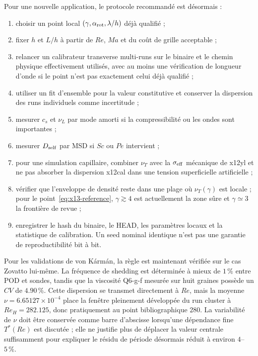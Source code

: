 \documentclass[11pt,a4paper]{article}
\begin{document}
Pour une nouvelle application, le protocole recommandé est désormais :
\begin{enumerate}[leftmargin=2em]
  \item choisir un point local $(\gamma,\alpha_{\rm rot},\lambda/h)$ déjà qualifié ;
  \item fixer $h$ et $L/h$ à partir de $Re$, $Ma$ et du coût de grille acceptable ;
  \item relancer un calibrateur transverse multi-runs sur le binaire et le chemin physique effectivement utilisés, avec au moins une vérification de longueur d'onde si le point n'est pas exactement celui déjà qualifié ;
  \item utiliser un fit d'ensemble pour la valeur constitutive et conserver la dispersion des runs individuels comme incertitude ;
  \item mesurer $c_s$ et $\nu_L$ par mode amorti si la compressibilité ou les ondes sont importantes ;
  \item mesurer $D_{\rm self}$ par MSD si $Sc$ ou $Pe$ intervient ;
  \item pour une simulation capillaire, combiner $\nu_T$ avec la $\sigma_{\rm eff}$ mécanique de x12yl et ne pas absorber la dispersion x12cal dans une tension superficielle artificielle ;
  \item vérifier que l'enveloppe de densité reste dans une plage où $\nu_T(\gamma)$ est locale ; pour le point~\eqref{eq:x13-reference}, $\gamma\gtrsim4$ est actuellement la zone sûre et $\gamma\simeq3$ la frontière de revue ;
  \item enregistrer le hash du binaire, le HEAD, les paramètres locaux et la statistique de calibration. Un seed nominal identique n'est pas une garantie de reproductibilité bit à bit.
\end{enumerate}

Pour les validations de von Kármán, la règle est maintenant vérifiée sur le cas Zovatto lui-même. La fréquence de shedding est déterminée à mieux de $1\,\%$ entre POD et sondes, tandis que la viscosité Q6-g-f mesurée sur huit graines possède un $CV$ de $4.90\,\%$. Cette dispersion se transmet directement à $Re$, mais la moyenne $\nu=6.65127\times10^{-4}$ place la fenêtre pleinement développée du run cluster à $Re_H=282.125$, donc pratiquement au point bibliographique $280$. La variabilité de $\nu$ doit être conservée comme barre d'abscisse lorsqu'une dépendance fine $T^*(Re)$ est discutée ; elle ne justifie plus de déplacer la valeur centrale suffisamment pour expliquer le résidu de période désormais réduit à environ $4$--$5\,\%$.
\end{document}
